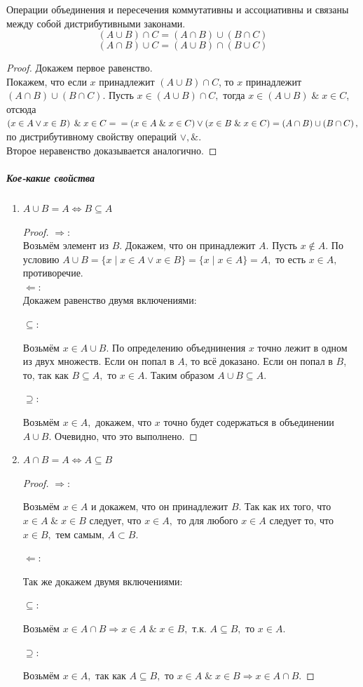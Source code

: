 Операции объединения и пересечения коммутативны и ассоциативны и связаны между собой дистрибутивными законами.
$$\left(A\cup B\right)\cap C = \left(A\cap B\right)\cup\left(B\cap C\right)$$
$$\left(A\cap B\right)\cup C = \left(A\cup B\right)\cap\left(B\cup C\right)$$
\begin{proof}
Докажем первое равенство. \\
Покажем, что если $x$ принадлежит $\left(A\cup B\right)\cap C$, то $x$ принадлежит $\left(A\cap B\right)\cup\left(B\cap C\right).$ Пусть $x\in \left(A\cup B\right)\cap C,$ тогда $x\in \left(A \cup B\right) \;\&\;x\in C$, отсюда $\left( x\in A \vee x\in B\right) \;\&\; x\in C = 
\\=\left(x\in A \;\&\; x\in C\right) \vee \left(x\in B \;\&\; x\in C\right) = \left(A\cap B\right)\cup\left(B\cap C\right),$ по дистрибутивному свойству операций $\vee,\&.$\\
Второе неравенство доказывается аналогично.
\end{proof}
\subparagraph{Кое-какие свойства}
\begin{enumerate}
\item $A\cup B = A \Leftrightarrow B\subseteq A$
\begin{proof}
$\Rightarrow:$
\\Возьмём элемент из $B.$ Докажем, что он принадлежит $A.$ Пусть $x\notin A.$ По условию $A\cup B = \{x\mid x\in A \vee x\in B\} = \{x\mid x\in A\} = A,$ то есть $x\in A,$ противоречие.\\
$\Leftarrow:$\\
Докажем равенство двумя включениями:

$\subseteq:$

Возьмём $x\in A\cup B.$ По определению объеднинения $x$ точно лежит в одном из двух множеств. Если он попал в $A$, то всё доказано. Если он попал в $B$, то, так как $B\subseteq A,$ то $x\in A.$ Таким образом $A\cup B\subseteq A.$

$\supseteq:$

Возьмём $x\in A,$ докажем, что $x$ точно будет содержаться в объединении $A\cup B.$ Очевидно, что это выполнено.
\end{proof}
\item $A\cap B = A \Leftrightarrow A\subseteq B$
\begin{proof}
$\Rightarrow:$

Возьмём $x\in A$ и докажем, что он принадлежит $B.$ Так как их того, что $x\in A \; \& \; x\in B$ следует, что $x\in A,$ то для любого $x\in A$ следует то, что $x\in B,$ тем самым, $A\subset B.$
\newpage

$\Leftarrow:$

Так же докажем двумя включениями:

$\subseteq:$

Возьмём $x\in A\cap B \Rightarrow x\in A \; \& \; x\in B,$ т.к. $A\subseteq B,$ то $x\in A.$

$\supseteq:$

Возьмём $x\in A,$ так как $A\subseteq B,$ то $x\in A \; \& \; x\in B \Rightarrow x\in A\cap B.$
\end{proof}
\end{enumerate}

